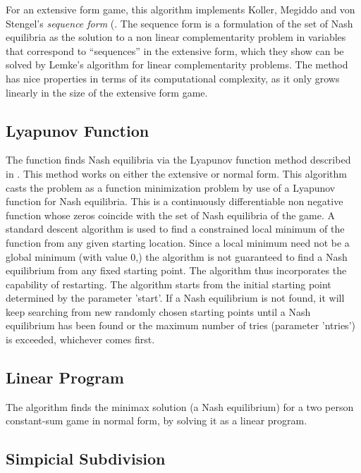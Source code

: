 For an extensive form game, this algorithm implements Koller, Megiddo
and von Stengel's {\em sequence form} (\cite{KolMegSte:94}. The
sequence form is a formulation of the set of Nash equilibria as the
solution to a non linear complementarity problem in variables that
correspond to ``sequences'' in the extensive form, which they show can
be solved by Lemke's algorithm for linear complementarity problems.
The method has nice properties in terms of its computational
complexity, as it only grows linearly in the size of the extensive
form game.  

\subsection{Lyapunov Function}

The  function finds Nash equilibria via the Lyapunov
function method described in \cite{McK:91}.  This method works on
either the extensive or normal form.  This algorithm casts the problem
as a function minimization problem by use of a Lyapunov function for
Nash equilibria.  This is a continuously differentiable non negative
function whose zeros coincide with the set of Nash equilibria of the
game.  A standard descent algorithm is used to find a constrained
local minimum of the function from any given starting location.  Since
a local minimum need not be a global minimum (with value 0,) the
algorithm is not guaranteed to find a Nash equilibrium from any fixed
starting point.  The algorithm thus incorporates the capability of
restarting.  The algorithm starts from the initial starting point
determined by the parameter 'start'.  If a Nash equilibrium is not
found, it will keep searching from new randomly chosen starting points
until a Nash equilibrium has  been found or the maximum number of tries
(parameter 'ntries') is exceeded, whichever comes first.

\subsection{Linear Program}

The  algorithm finds the minimax solution (a Nash
equilibrium) for a two person constant-sum game in normal form, by
solving it as a linear program.

\subsection{Simpicial Subdivision}

